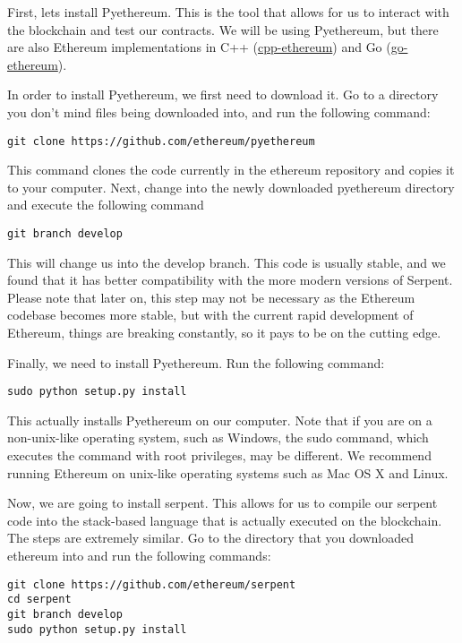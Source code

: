 \documentclass[12pt]{article}
\begin{document}
First, lets install Pyethereum. This is the tool that allows for us to interact with the blockchain and test our contracts. We will be using Pyethereum, but there are also Ethereum implementations in C++ (\href{https://github.com/ethereum/cpp-ethereum}{cpp-ethereum}) and Go (\href{https://github.com/ethereum/go-ethereum}{go-ethereum}).

In order to install Pyethereum, we first need to download it. Go to a directory you don't mind files being downloaded into, and run the following command:

\begin{lstlisting}
git clone https://github.com/ethereum/pyethereum
\end{lstlisting}

This command clones the code currently in the ethereum repository and copies it to your computer. Next, change into the newly downloaded pyethereum directory and execute the following command

\begin{lstlisting}
git branch develop
\end{lstlisting}

This will change us into the develop branch. This code is usually stable, and we found that it has better compatibility with the more modern versions of Serpent. Please note that later on, this step may not be necessary as the Ethereum codebase becomes more stable, but with the current rapid development of Ethereum, things are breaking constantly, so it pays to be on the cutting edge.

Finally, we need to install Pyethereum. Run the following command:

\begin{lstlisting}
sudo python setup.py install
\end{lstlisting}

This actually installs Pyethereum on our computer. Note that if you are on a non-unix-like operating system, such as Windows, the sudo command, which executes the command with root privileges, may be different. We recommend running Ethereum on unix-like operating systems such as Mac OS X and Linux.

Now, we are going to install serpent. This allows for us to compile our serpent code into the stack-based language that is actually executed on the blockchain. The steps are extremely similar. Go to the directory that you downloaded ethereum into and run the following commands:

\begin{lstlisting}
git clone https://github.com/ethereum/serpent
cd serpent
git branch develop
sudo python setup.py install
\end{lstlisting}
\end{document}
